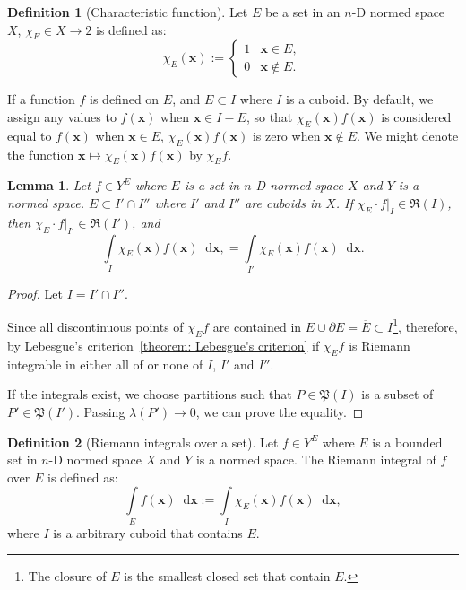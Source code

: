 \documentclass[openany]{book}
\theoremstyle{plain}
\newtheorem{lemma}{Lemma} %
\theoremstyle{definition}
\newtheorem{definition}{Definition}[section] %
\newcommand{\dif}{\mathop{}\!\mathrm{d}} %
\newcommand*{\bv}{\boldsymbol} %
\begin{document}
\begin{definition}[Characteristic function]
	Let $E$ be a set in an $n$-D normed space $X$, $\chi_E \in X \to 2$ is defined as:
	\begin{equation*}
		\chi_E(\bv x) := \begin{cases}
			1 & \bv x \in E,
			\\
			0 & \bv x \notin E.
		\end{cases}
	\end{equation*}
\end{definition}

If a function $f$ is defined on $E$, and $E \subset I$ where $I$ is a cuboid. 
By default, we assign any values to $f(\bv x)$ when $\bv x \in I - E$, so that $\chi_E(\bv x) f(\bv x)$ is considered equal to $f(\bv x)$ when $\bv x \in E$, $\chi_E(\bv x) f(\bv x)$ is zero when $\bv x \notin E$. 
We might denote the function $\bv x \mapsto \chi_E(\bv x) f(\bv x)$ by $\chi_E f$.

\begin{lemma}
	Let $f \in Y^E$ where $E$ is a set in $n$-D normed space $X$ and $Y$ is a normed space.
	$E \subset I' \cap I''$ where $I'$ and $I''$ are cuboids in $X$. 
	If $\chi_E \cdot f|_I \in \mathfrak R(I)$, then $\chi_E \cdot f|_{I'} \in \mathfrak R(I')$, and
	\begin{equation*}
		\int\limits_{I} \chi_E(\bv x) f(\bv x) \dif \bv x,
			= \int\limits_{I'} \chi_E(\bv x) f(\bv x) \dif \bv x.
	\end{equation*} 
\end{lemma}
\begin{proof}
	Let $I = I' \cap I''$. 

	Since all discontinuous points of $\chi_E f$ are contained in $E \cup \partial E = \overline{E}\subset I$\footnote{The closure of $E$ is the smallest closed set that contain $E$.}, therefore, by Lebesgue's criterion~\ref{theorem: Lebesgue's criterion} if $\chi_E f$ is Riemann integrable in either all of or none of $I$, $I'$ and $I''$.

	If the integrals exist, we choose partitions such that $P \in \mathfrak P(I)$ is a subset of $P' \in \mathfrak P(I')$. Passing $\lambda(P') \to 0$, we can prove the equality.
\end{proof}

\begin{definition}[Riemann integrals over a set]
	Let $f \in Y^E$ where $E$ is a bounded set in $n$-D normed space $X$ and $Y$ is a normed space.
	The Riemann integral of $f$ over $E$ is defined as:
	\begin{equation*}
		\int\limits_E f(\bv x) \dif \bv x := \int\limits_I \chi_E(\bv x) f(\bv x) \dif \bv x,
	\end{equation*}
	where $I$ is a arbitrary cuboid that contains $E$.
\end{definition}
\end{document}
